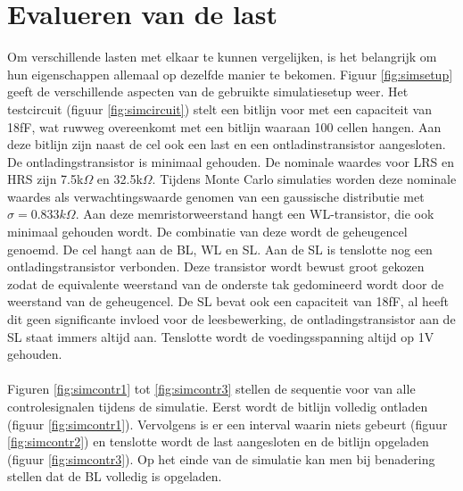 \section{Evalueren van de last}
Om verschillende lasten met elkaar te kunnen vergelijken, is het belangrijk om hun eigenschappen allemaal op dezelfde manier te bekomen. Figuur \ref{fig:simsetup} geeft de verschillende aspecten van de gebruikte simulatiesetup weer. Het testcircuit (figuur \ref{fig:simcircuit}) stelt een bitlijn voor met een capaciteit van 18fF, wat ruwweg overeenkomt met een bitlijn waaraan 100 cellen hangen. Aan deze bitlijn zijn naast de cel ook een last en een ontladinstransistor aangesloten. De ontladingstransistor is minimaal gehouden. De nominale waardes voor LRS en HRS zijn 7.5k$\Omega$ en 32.5k$\Omega$. Tijdens Monte Carlo simulaties worden deze nominale waardes als verwachtingswaarde genomen van een gaussische distributie met $\sigma = 0.833k\Omega$. Aan deze memristorweerstand hangt een WL-transistor, die ook minimaal gehouden wordt. De combinatie van deze wordt de geheugencel genoemd. De cel hangt aan de BL, WL en SL. Aan de SL is tenslotte nog een ontladingstransistor verbonden. Deze transistor wordt bewust groot gekozen zodat de equivalente weerstand van de onderste tak gedomineerd wordt door de weerstand van de geheugencel. De SL bevat ook een capaciteit van 18fF, al heeft dit geen significante invloed voor de leesbewerking, de ontladingstransistor aan de SL staat immers altijd aan. Tenslotte wordt de voedingsspanning altijd op 1V gehouden.\\\\
Figuren \ref{fig:simcontr1} tot \ref{fig:simcontr3} stellen de sequentie voor van alle controlesignalen tijdens de simulatie. Eerst wordt de bitlijn volledig ontladen (figuur \ref{fig:simcontr1}). Vervolgens is er een interval waarin niets gebeurt (figuur \ref{fig:simcontr2}) en tenslotte wordt de last aangesloten en de bitlijn opgeladen (figuur \ref{fig:simcontr3}). Op het einde van de simulatie kan men bij benadering stellen dat de BL volledig is opgeladen.\\


